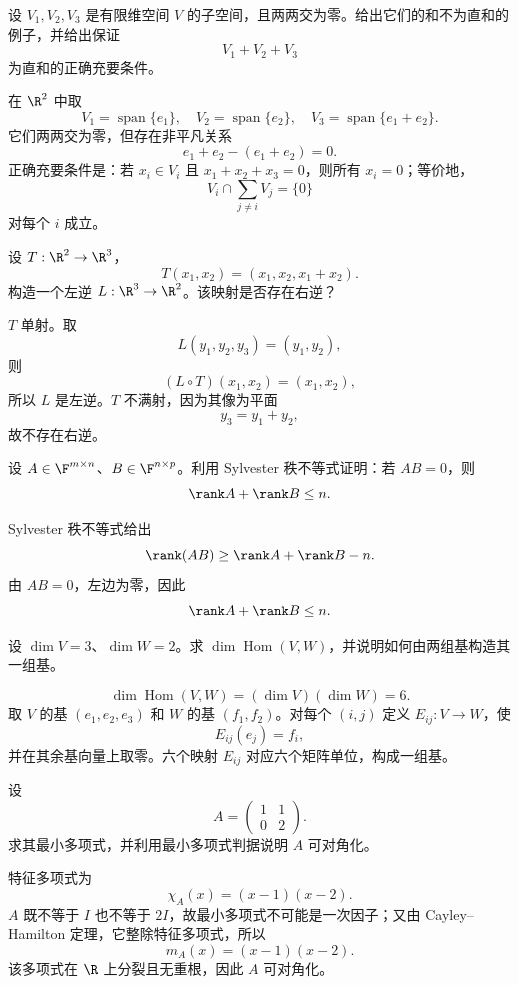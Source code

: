 \begin{exercise}[level=advanced]
设 $V_1,V_2,V_3$ 是有限维空间 $V$ 的子空间，且两两交为零。给出它们的和不为直和的例子，并给出保证
\[
V_1+V_2+V_3
\]
为直和的正确充要条件。
\begin{solution}
在 $\R^2$ 中取
\[
V_1=\operatorname{span}\{e_1\},\quad
V_2=\operatorname{span}\{e_2\},\quad
V_3=\operatorname{span}\{e_1+e_2\}.
\]
它们两两交为零，但存在非平凡关系
\[
e_1+e_2-(e_1+e_2)=0.
\]
正确充要条件是：若 $x_i\in V_i$ 且 $x_1+x_2+x_3=0$，则所有 $x_i=0$；等价地，
\[
V_i\cap\sum_{j\ne i}V_j=\{0\}
\]
对每个 $i$ 成立。
\end{solution}
\end{exercise}

\begin{exercise}[level=advanced]
设 $T:\R^2\to\R^3$，
\[
T(x_1,x_2)=(x_1,x_2,x_1+x_2).
\]
构造一个左逆 $L:\R^3\to\R^2$。该映射是否存在右逆？
\begin{solution}
$T$ 单射。取
\[
L(y_1,y_2,y_3)=(y_1,y_2),
\]
则
\[
(L\circ T)(x_1,x_2)=(x_1,x_2),
\]
所以 $L$ 是左逆。$T$ 不满射，因为其像为平面
\[
y_3=y_1+y_2,
\]
故不存在右逆。
\end{solution}
\end{exercise}

\begin{exercise}[level=advanced]
设 $A\in\F^{m\times n}$、$B\in\F^{n\times p}$。利用 Sylvester 秩不等式证明：若 $AB=0$，则
\[
\rank A+\rank B\le n.
\]
\begin{solution}
Sylvester 秩不等式给出
\[
\rank(AB)\ge\rank A+\rank B-n.
\]
由 $AB=0$，左边为零，因此
\[
\rank A+\rank B\le n.
\]
\end{solution}
\end{exercise}

\begin{exercise}[level=advanced]
设 $\dim V=3$、$\dim W=2$。求 $\dim\operatorname{Hom}(V,W)$，并说明如何由两组基构造其一组基。
\begin{solution}
\[
\dim\operatorname{Hom}(V,W)
=(\dim V)(\dim W)=6.
\]
取 $V$ 的基 $(e_1,e_2,e_3)$ 和 $W$ 的基 $(f_1,f_2)$。对每个 $(i,j)$ 定义 $E_{ij}:V\to W$，使
\[
E_{ij}(e_j)=f_i,
\]
并在其余基向量上取零。六个映射 $E_{ij}$ 对应六个矩阵单位，构成一组基。
\end{solution}
\end{exercise}

\begin{exercise}[level=advanced]
设
\[
A=\begin{pmatrix}1&1\\0&2\end{pmatrix}.
\]
求其最小多项式，并利用最小多项式判据说明 $A$ 可对角化。
\begin{solution}
特征多项式为
\[
\chi_A(x)=(x-1)(x-2).
\]
$A$ 既不等于 $I$ 也不等于 $2I$，故最小多项式不可能是一次因子；又由 Cayley--Hamilton 定理，它整除特征多项式，所以
\[
m_A(x)=(x-1)(x-2).
\]
该多项式在 $\R$ 上分裂且无重根，因此 $A$ 可对角化。
\end{solution}
\end{exercise}

